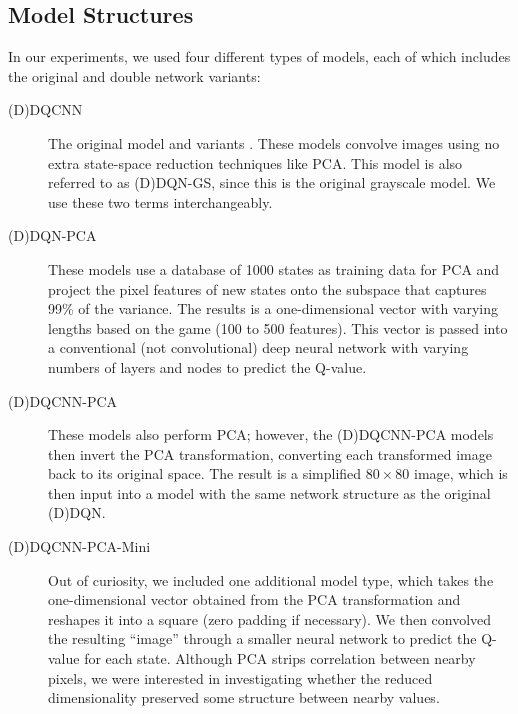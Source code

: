 \documentclass[11pt]{article}
\begin{document}
\subsection{Model Structures}
\label{subsec:model_structure}

In our experiments, we used four different types of models, each of which includes the original and double network variants: 

\begin{description}
    \item[(D)DQCNN] The original model \cite{mnih2013playing, mnih2015human} and variants \cite{van2016deep}. These models convolve images using no extra state-space reduction techniques like PCA. This model is also referred to as (D)DQN-GS, since this is the original grayscale model. We use these two terms interchangeably.
    
    \item[(D)DQN-PCA] These models use a database of 1000 states as training data for PCA and project the pixel features of new states onto the subspace that captures 99\% of the variance. The results is a one-dimensional vector with varying lengths based on the game (100 to 500 features). This vector is passed into a conventional (not convolutional) deep neural network with varying numbers of layers and nodes to predict the Q-value.
    
    \item[(D)DQCNN-PCA] These models also perform PCA; however, the (D)DQCNN-PCA models then invert the PCA transformation, converting each transformed image back to its original space. The result is a simplified $80 \times 80$ image, which is then input into a model with the same network structure as the original (D)DQN.
    
    \item[(D)DQCNN-PCA-Mini] Out of curiosity, we included one additional model type, which takes the one-dimensional vector obtained from the PCA transformation and reshapes it into a square (zero padding if necessary). We then convolved the resulting ``image'' through a smaller neural network to predict the Q-value for each state. Although PCA strips correlation between nearby pixels, we were interested in investigating whether the reduced dimensionality preserved some structure between nearby values.
\end{description}
\end{document}
